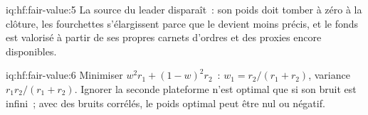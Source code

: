 \begin{solution}{iq:hf:fair-value:5}
La source du leader disparaît~: son poids doit tomber à zéro à la clôture, les fourchettes s'élargissent parce que le  devient moins précis, et le fonds
est valorisé à partir de ses propres carnets d'ordres et des proxies encore disponibles.
\end{solution}

\begin{solution}{iq:hf:fair-value:6}
Minimiser $w^2r_1+(1-w)^2r_2$~: $w_1=r_2/(r_1+r_2)$, variance $r_1r_2/(r_1+r_2)$. Ignorer la seconde plateforme n'est optimal que si son bruit est infini~;
avec des bruits corrélés, le poids optimal peut être nul ou négatif.
\end{solution}
